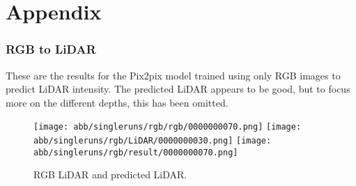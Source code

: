 \chapter{Appendix}
\subsection{RGB to LiDAR}

These are the results for the Pix2pix model trained using only RGB images to predict LiDAR intensity. The predicted LiDAR appears to be good, but to focus more on the different depths, this has been omitted.
\begin{figure}[!ht]
	\centering
	\texttt{[image: abb/singleruns/rgb/rgb/0000000070.png]}
	\texttt{[image: abb/singleruns/rgb/LiDAR/0000000030.png]}
	\texttt{[image: abb/singleruns/rgb/result/0000000070.png]}
	\caption{RGB LiDAR and predicted LiDAR.}
	\label{rgb}
\end{figure}




